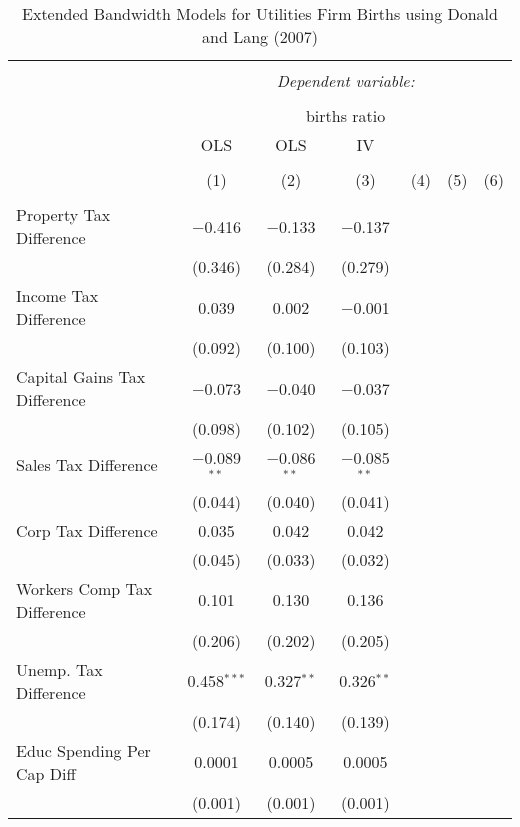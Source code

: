 
\begin{table}[!htbp] \centering 
  \caption{Extended Bandwidth Models for  Utilities Firm Births using Donald and Lang (2007)} 
  \label{} 
\begin{tabular}{@{\extracolsep{5pt}}lcccccc} 
\\[-1.8ex]\hline 
\hline \\[-1.8ex] 
 & \multicolumn{6}{c}{\textit{Dependent variable:}} \\ 
\cline{2-7} 
\\[-1.8ex] & \multicolumn{6}{c}{births ratio} \\ 
 & OLS & OLS & IV &  &  &  \\ 
\\[-1.8ex] & (1) & (2) & (3) & (4) & (5) & (6)\\ 
\hline \\[-1.8ex] 
 Property Tax Difference & $-$0.416 & $-$0.133 & $-$0.137 &  &  &  \\ 
  & (0.346) & (0.284) & (0.279) &  &  &  \\ 
  Income Tax Difference & 0.039 & 0.002 & $-$0.001 &  &  &  \\ 
  & (0.092) & (0.100) & (0.103) &  &  &  \\ 
  Capital Gains Tax Difference & $-$0.073 & $-$0.040 & $-$0.037 &  &  &  \\ 
  & (0.098) & (0.102) & (0.105) &  &  &  \\ 
  Sales Tax Difference & $-$0.089$^{**}$ & $-$0.086$^{**}$ & $-$0.085$^{**}$ &  &  &  \\ 
  & (0.044) & (0.040) & (0.041) &  &  &  \\ 
  Corp Tax Difference & 0.035 & 0.042 & 0.042 &  &  &  \\ 
  & (0.045) & (0.033) & (0.032) &  &  &  \\ 
  Workers Comp Tax Difference & 0.101 & 0.130 & 0.136 &  &  &  \\ 
  & (0.206) & (0.202) & (0.205) &  &  &  \\ 
  Unemp. Tax Difference & 0.458$^{***}$ & 0.327$^{**}$ & 0.326$^{**}$ &  &  &  \\ 
  & (0.174) & (0.140) & (0.139) &  &  &  \\ 
  Educ Spending Per Cap Diff & 0.0001 & 0.0005 & 0.0005 &  &  &  \\ 
  & (0.001) & (0.001) & (0.001) &  &  &  \\ 

\end{tabular}
\end{table}
